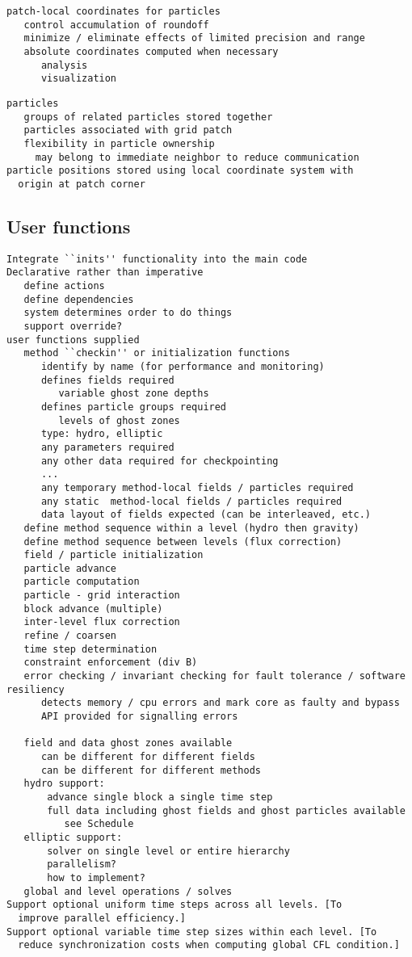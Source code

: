 \documentclass[10pt]{article}
\begin{document}
\begin{verbatim}
patch-local coordinates for particles
   control accumulation of roundoff
   minimize / eliminate effects of limited precision and range
   absolute coordinates computed when necessary
      analysis
      visualization
\end{verbatim}

\begin{verbatim}
particles
   groups of related particles stored together
   particles associated with grid patch
   flexibility in particle ownership
     may belong to immediate neighbor to reduce communication
particle positions stored using local coordinate system with
  origin at patch corner
\end{verbatim}


\subsection{User functions} \label{ss:design-user}

\begin{verbatim}
Integrate ``inits'' functionality into the main code
Declarative rather than imperative
   define actions
   define dependencies
   system determines order to do things
   support override?
user functions supplied
   method ``checkin'' or initialization functions
      identify by name (for performance and monitoring)
      defines fields required
         variable ghost zone depths
      defines particle groups required
         levels of ghost zones
      type: hydro, elliptic
      any parameters required
      any other data required for checkpointing
      ... 
      any temporary method-local fields / particles required
      any static  method-local fields / particles required
      data layout of fields expected (can be interleaved, etc.)
   define method sequence within a level (hydro then gravity)
   define method sequence between levels (flux correction)
   field / particle initialization
   particle advance
   particle computation
   particle - grid interaction
   block advance (multiple)
   inter-level flux correction
   refine / coarsen
   time step determination
   constraint enforcement (div B)
   error checking / invariant checking for fault tolerance / software resiliency
      detects memory / cpu errors and mark core as faulty and bypass
      API provided for signalling errors
 
   field and data ghost zones available
      can be different for different fields
      can be different for different methods
   hydro support:
       advance single block a single time step
       full data including ghost fields and ghost particles available 
          see Schedule
   elliptic support:
       solver on single level or entire hierarchy
       parallelism?
       how to implement?
   global and level operations / solves
Support optional uniform time steps across all levels. [To
  improve parallel efficiency.]
Support optional variable time step sizes within each level. [To
  reduce synchronization costs when computing global CFL condition.]
\end{verbatim}
\end{document}
